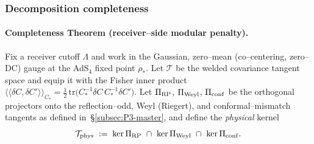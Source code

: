 \documentclass[10pt]{article}
\theoremstyle{definition}
\theoremstyle{plain}
\begin{document}
\subsubsection*{Decomposition completeness}\label{subsubsec:uom-main-007}

\paragraph{Completeness Theorem (receiver–side modular penalty).}
\label{par:completeness-theorem}
Fix a receiver cutoff $\Lambda$ and work in the Gaussian, zero–mean (co–centering, zero–DC) gauge at the AdS$_4$ fixed point $\rho_\ast$.
Let $\mathscr T$ be the welded covariance tangent space and equip it with the Fisher inner product
$\langle\!\langle \delta C,\delta C'\rangle\!\rangle_{C_\ast}=\tfrac12\,\mathrm{tr}\!\big(C_\ast^{-1}\delta C\,C_\ast^{-1}\delta C'\big)$.
Let $\Pi_{\rm RP}$, $\Pi_{\rm Weyl}$, $\Pi_{\rm conf}$ be the orthogonal projectors onto the reflection–odd, Weyl (Riegert), and conformal–mismatch tangents as defined in~\S\ref{subsec:P3-master}, and define the \emph{physical} kernel
\[
\mathcal T_{\rm phys}\;:=\;\ker\Pi_{\rm RP}\ \cap\ \ker\Pi_{\rm Weyl}\ \cap\ \ker\Pi_{\rm conf}.
\]
\end{document}
